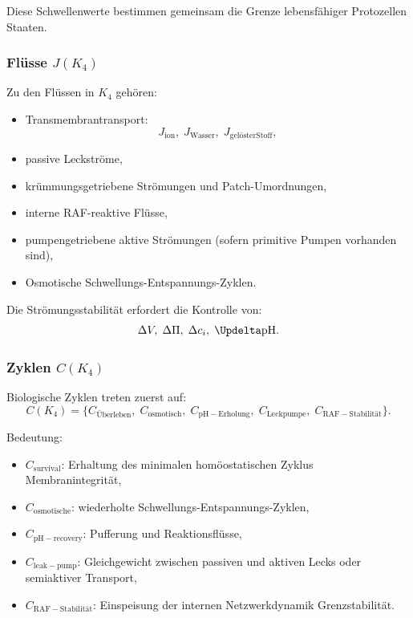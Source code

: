 Diese Schwellenwerte bestimmen gemeinsam die Grenze lebensfähiger Protozellen
Staaten.

\subsubsection{Flüsse \texorpdfstring{$J(K_4)$}{J(K_4)}}

Zu den Flüssen in $K_4$ gehören:
\begin{itemize}
    \item Transmembrantransport:
          \[
          J_{\mathrm{ion}},\; J_{\mathrm{Wasser}},\; J_{\mathrm{gelöster Stoff}},
          \]
    \item passive Leckströme,
    \item krümmungsgetriebene Strömungen und Patch-Umordnungen,
    \item interne RAF-reaktive Flüsse,
    \item pumpengetriebene aktive Strömungen (sofern primitive Pumpen vorhanden sind),
    \item Osmotische Schwellungs-Entspannungs-Zyklen.
\end{itemize}

Die Strömungsstabilität erfordert die Kontrolle von:
\[
\Delta V,\; \Delta \Pi,\; \Delta c_i,\; \Updelta \mathrm{pH}.
\]

\subsubsection{Zyklen \texorpdfstring{$C(K_4)$}{C(K_4)}}

Biologische Zyklen treten zuerst auf:
\[
C(K_4) =
\{ C_{\mathrm{Überleben}},\;
   C_{\mathrm{osmotisch}},\;
   C_{\mathrm{pH-Erholung}},\;
   C_{\mathrm{Leckpumpe}},\;
   C_{\mathrm{RAF-Stabilität}} \}.
\]

Bedeutung:
\begin{itemize}
    \item $C_{\mathrm{survival}}$: Erhaltung des minimalen homöostatischen Zyklus
          Membranintegrität,
    \item $C_{\mathrm{osmotische}}$: wiederholte Schwellungs-Entspannungs-Zyklen,
    \item $C_{\mathrm{pH-recovery}}$: Pufferung und Reaktionsflüsse,
    \item $C_{\mathrm{leak-pump}}$: Gleichgewicht zwischen passiven und aktiven Lecks
          oder semiaktiver Transport,
    \item $C_{\mathrm{RAF-Stabilität}}$: Einspeisung der internen Netzwerkdynamik
          Grenzstabilität.
\end{itemize}

